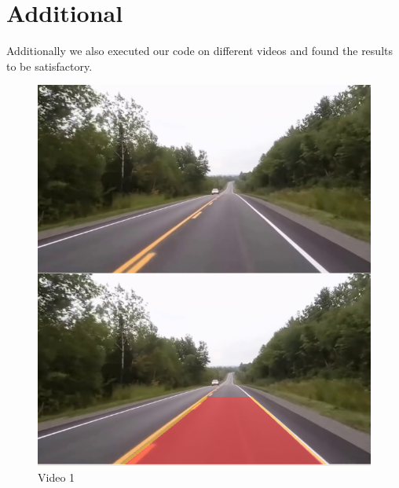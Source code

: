 \documentclass[12pt]{report}
\begin{document}
{\section*{Additional}
Additionally we also executed our code on different videos and found the results to be satisfactory.
\begin{figure}[h!]
    \centering
    \includegraphics[scale=0.4]{video1__01.png}
    \caption{Video 1}
    \label{fig:my_label2}
\end{figure}

}
\end{document}
